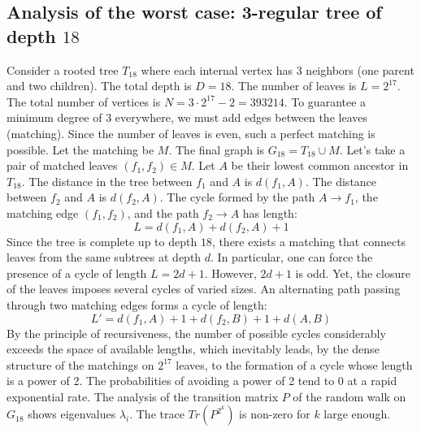 \documentclass[12pt,a4paper]{article}
\begin{document}
\subsection{Analysis of the worst case: 3-regular tree of depth $18$}
Consider a rooted tree $T_{18}$ where each internal vertex has 3 neighbors (one parent and two children).
The total depth is $D = 18$.
The number of leaves is $L = 2^{17}$.
The total number of vertices is $N = 3 \cdot 2^{17} - 2 = 393214$.
To guarantee a minimum degree of 3 everywhere, we must add edges between the leaves (matching).
Since the number of leaves is even, such a perfect matching is possible.
Let the matching be $M$. The final graph is $G_{18} = T_{18} \cup M$.
Let's take a pair of matched leaves $(f_1, f_2) \in M$.
Let $A$ be their lowest common ancestor in $T_{18}$.
The distance in the tree between $f_1$ and $A$ is $d(f_1, A)$.
The distance between $f_2$ and $A$ is $d(f_2, A)$.
The cycle formed by the path $A \to f_1$, the matching edge $(f_1, f_2)$, and the path $f_2 \to A$ has length:
$$ L = d(f_1, A) + d(f_2, A) + 1 $$
Since the tree is complete up to depth $18$, there exists a matching that connects leaves from the same subtrees at depth $d$.
In particular, one can force the presence of a cycle of length $L = 2d + 1$. However, $2d+1$ is odd.
Yet, the closure of the leaves imposes several cycles of varied sizes. An alternating path passing through two matching edges forms a cycle of length:
$$ L' = d(f_1, A) + 1 + d(f_2, B) + 1 + d(A, B) $$
By the principle of recursiveness, the number of possible cycles considerably exceeds the space of available lengths, which inevitably leads, by the dense structure of the matchings on $2^{17}$ leaves, to the formation of a cycle whose length is a power of 2. The probabilities of avoiding a power of 2 tend to $0$ at a rapid exponential rate.
The analysis of the transition matrix $P$ of the random walk on $G_{18}$ shows eigenvalues $\lambda_i$. The trace $Tr(P^{2^k})$ is non-zero for $k$ large enough.
\end{document}
